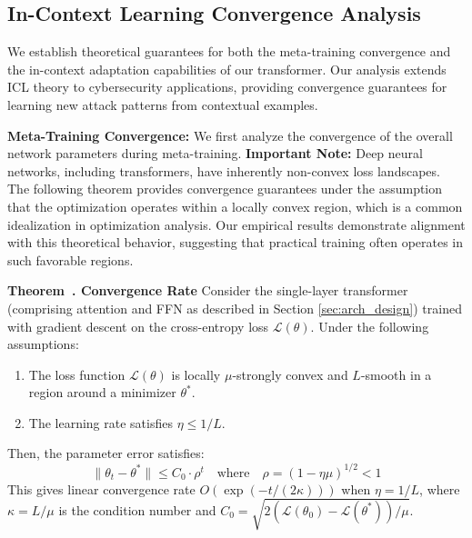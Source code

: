 \documentclass[journal]{IEEEtran}
\newcounter{theorem}
\newenvironment{theorem}[1][]{\refstepcounter{theorem}\par\medskip
   \noindent \textbf{Theorem~\thetheorem. #1} \rmfamily}{\medskip}
\begin{document}
\subsection{In-Context Learning Convergence Analysis}

We establish theoretical guarantees for both the meta-training convergence and the in-context adaptation capabilities of our transformer. Our analysis extends ICL theory to cybersecurity applications, providing convergence guarantees for learning new attack patterns from contextual examples.

\textbf{Meta-Training Convergence:} We first analyze the convergence of the overall network parameters during meta-training. \textbf{Important Note:} Deep neural networks, including transformers, have inherently non-convex loss landscapes. The following theorem provides convergence guarantees under the assumption that the optimization operates within a locally convex region, which is a common idealization in optimization analysis. Our empirical results demonstrate alignment with this theoretical behavior, suggesting that practical training often operates in such favorable regions.

\begin{theorem}[Convergence Rate]
\label{thm:convergence}
Consider the single-layer transformer (comprising attention and FFN as described in Section \ref{sec:arch_design}) trained with gradient descent on the cross-entropy loss $\mathcal{L}(\theta)$. Under the following assumptions:
\begin{enumerate}
\item The loss function $\mathcal{L}(\theta)$ is locally $\mu$-strongly convex and $L$-smooth in a region around a minimizer $\theta^*$.
\item The learning rate satisfies $\eta \leq 1/L$.
\end{enumerate}
Then, the parameter error satisfies:
\begin{equation}
\|\theta_t - \theta^*\| \leq C_0 \cdot \rho^t \quad \text{where} \quad \rho = (1 - \eta\mu)^{1/2} < 1
\end{equation}
This gives linear convergence rate $O(\exp(-t/(2\kappa)))$ when $\eta = 1/L$, where $\kappa = L/\mu$ is the condition number and $C_0 = \sqrt{2(\mathcal{L}(\theta_0) - \mathcal{L}(\theta^*))/\mu}$.
\end{theorem}
\end{document}
